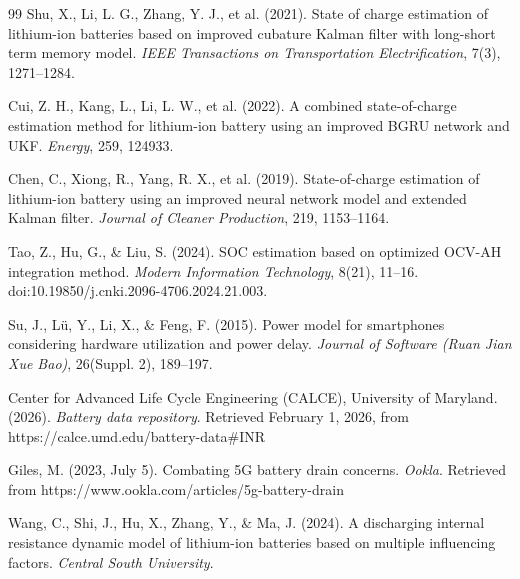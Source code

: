 \begin{thebibliography}{99}
Shu, X., Li, L. G., Zhang, Y. J., et al. (2021). State of charge estimation of lithium-ion batteries based on improved cubature Kalman filter with long-short term memory model. \textit{IEEE Transactions on Transportation Electrification}, 7(3), 1271–1284.

Cui, Z. H., Kang, L., Li, L. W., et al. (2022). A combined state-of-charge estimation method for lithium-ion battery using an improved BGRU network and UKF. \textit{Energy}, 259, 124933.

Chen, C., Xiong, R., Yang, R. X., et al. (2019). State-of-charge estimation of lithium-ion battery using an improved neural network model and extended Kalman filter. \textit{Journal of Cleaner Production}, 219, 1153–1164.

Tao, Z., Hu, G., \& Liu, S. (2024). SOC estimation based on optimized OCV-AH integration method. \textit{Modern Information Technology}, 8(21), 11–16. doi:10.19850/j.cnki.2096-4706.2024.21.003.

Su, J., Lü, Y., Li, X., \& Feng, F. (2015). Power model for smartphones considering hardware utilization and power delay. \textit{Journal of Software (Ruan Jian Xue Bao)}, 26(Suppl. 2), 189–197.

Center for Advanced Life Cycle Engineering (CALCE), University of Maryland. (2026). \textit{Battery data repository}. Retrieved February 1, 2026, from https://calce.umd.edu/battery-data\#INR

Giles, M. (2023, July 5). Combating 5G battery drain concerns. \textit{Ookla}. Retrieved from https://www.ookla.com/articles/5g-battery-drain

Wang, C., Shi, J., Hu, X., Zhang, Y., \& Ma, J. (2024). A discharging internal resistance dynamic model of lithium-ion batteries based on multiple influencing factors. \textit{Central South University}.

\end{thebibliography}